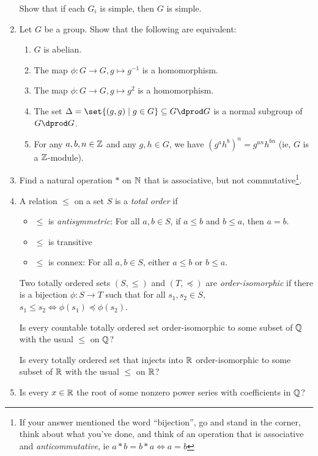 \documentclass[a4paper,12pt]{article}
\begin{document}
\begin{enumerate}[leftmargin=*]
  Show that if each \(G_i\) is simple, then \(G\) is simple.
 \item
  Let \(G\) be a group. Show that the following are equivalent:
  \begin{enumerate}[label=(\roman*)]
   \item
    \(G\) is abelian.
   \item
    The map \(\phi: G \to G, g \mapsto g^{-1}\) is a homomorphism.
   \item
    The map \(\phi: G \to G, g \mapsto g^2\) is a homomorphism.
   \item
    The set \(\Delta = \set{(g, g) \mid g \in G} \subset G \dprod G\) is a
    normal subgroup of \(G \dprod G\).
   \item
    For any \(a, b, n \in \mathbb Z\) and any \(g, h \in G\), we have
    \((g^a h^b)^n = g^{an} h^{bn}\) (ie, \(G\) is a \(\mathbb Z\)-module).
  \end{enumerate}
 \item
  Find a natural operation \(\ast\) on \(\mathbb N\) that is associative, but not
  commutative\footnote{If your answer mentioned the word ``bijection'', go and
  stand in the corner, think about what you've done, and think of an operation
  that is associative and \emph{anticommutative}, ie
  \(a \ast b = b \ast a \iff a = b\)}.
 \item
  A relation \(\le\) on a set \(S\) is a \emph{total order} if
  \begin{itemize}
   \item
    \(\le\) is \emph{antisymmetric}: For all \(a, b \in S\), if \(a \le b\) and
    \(b \le a\), then \(a = b\).
   \item
    \(\le\) is transitive
   \item
    \(\le\) is connex: For all \(a, b \in S\), either
    \(a \le b\) or \(b \le a\).
  \end{itemize}
  Two totally ordered sets \((S, \le)\) and \((T, \preceq)\) are
  \emph{order-isomorphic} if there is a bijection \(\phi: S \to T\) such that
  for all \(s_1, s_2 \in S\),
  \(s_1 \le s_2 \iff \phi(s_1) \preceq \phi(s_2)\).

  Is every countable totally ordered set order-isomorphic to some subset of
  \(\mathbb Q\) with the usual \(\le\) on \(\mathbb Q\)?

  Is every totally ordered set that injects into \(\mathbb R\) order-isomorphic to some
  subset of \(\mathbb R\) with the usual \(\le\) on \(\mathbb R\)?
 \item
  Is every \(x \in \mathbb R\) the root of some nonzero power series with coefficients
  in \(\mathbb Q\)?


\end{enumerate}
\end{document}
